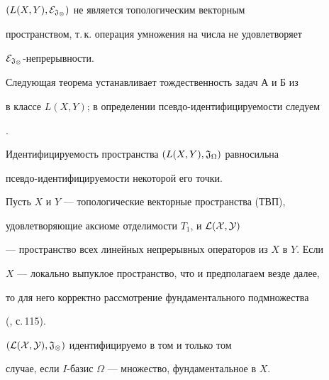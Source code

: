  


\begin{note} 


$(L(X,Y),\cal E_{\frak J_\Omega})$ не является топологическим векторным 


пространством, т.\,к. операция умножения на числа не удовлетворяет 


$\cal E_{\frak J_\Omega}$-непрерывности. 


\end{note} 


 


Следующая теорема устанавливает тождественность задач А и Б из \cite{1} 


в классе $L(X,Y)$; в определении псевдо-идентифицируемости следуем 


\cite{1}. 


 


\begin{thm} 


Идентифицируемость пространства $(L(X,Y),\frak J_\Omega)$ равносильна 


псевдо-иден\-ти\-фицируемости некоторой его точки. 


\end{thm} 


 


Пусть $X$ и $Y$ --- топологические векторные пространства (ТВП), 


удовлетворяющие аксиоме отделимости $T_1$, и $\cal L(X,Y)$ \label{space}


--- пространство всех линейных непрерывных операторов из $X$ в $Y$. Если 


$X$ --- локально выпуклое пространство, что и предполагаем везде далее, 


то для него корректно рассмотрение фундаментального подмножества 


(\cite{13}, с.\,115). 


 


\begin{thm} 


$(\cal L(X,Y),\frak J_\Omega)$ идентифицируемо в том и только том 


случае, если $I$-базис $\Omega$ --- множество, фундаментальное в $X$. 


\end{thm} 


